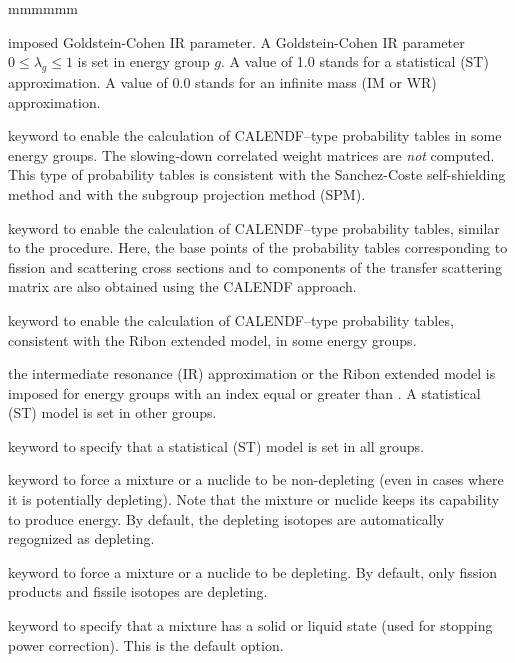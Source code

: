 \begin{ListeDeDescription}{mmmmmm}
\item[\dusa{gir}]  imposed Goldstein-Cohen IR parameter. A Goldstein-Cohen IR parameter
$0 \le \lambda_g\le 1$ is set in energy group $g$. A value of 1.0 stands for
a statistical (ST) approximation. A value of 0.0 stands for an infinite mass
(IM or WR) approximation.

\item[\moc{PT}] keyword to enable the calculation of CALENDF--type probability tables in some energy groups. The
slowing-down correlated weight matrices are {\sl not} computed. This type of probability tables is consistent
with the Sanchez-Coste self-shielding method and with the subgroup projection method (SPM).\cite{SPM09}

\item[\moc{PTMC}] keyword to enable the calculation of CALENDF--type probability tables, similar to the 
procedure. Here, the base points of the probability tables corresponding
to fission and scattering cross sections and to components of the transfer scattering matrix are also obtained using the CALENDF approach.

\item[\moc{PTSL}] keyword to enable the calculation of CALENDF--type probability tables, consistent
with the Ribon extended model, in some energy groups.

\item[\dusa{nir}]  the intermediate resonance (IR) approximation or the Ribon extended
model is imposed for energy groups with an index equal or greater than .
A statistical (ST) model is set in other groups.

\item[\moc{NONE}] keyword to specify that a statistical (ST) model is set in
all groups.

\item[\moc{NOEV}] keyword to force a mixture or a nuclide to be non-depleting (even in
cases where it is potentially depleting). Note that the mixture or nuclide keeps its
capability to produce energy. By default, the depleting isotopes are
automatically regognized as depleting.

\item[\moc{EVOL}] keyword to force a mixture or a nuclide to be depleting. By default, only fission products and
fissile isotopes are depleting.

\item[\moc{NOGAS}] keyword to specify that a mixture has a solid or liquid state (used for stopping power correction).
This is the default option.


\end{ListeDeDescription}
